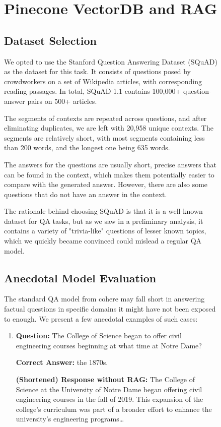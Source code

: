\documentclass[12pt]{article}
\begin{document}
\begin{figure}[H]
\newpage

\section{Pinecone VectorDB and RAG}

\subsection{Dataset Selection}

We opted to use the Stanford Question Answering Dataset (SQuAD) as the dataset for this task. 
It consists of questions posed by crowdworkers on a set of Wikipedia articles, with corresponding reading passages.
In total, SQuAD 1.1 contains 100,000+ question-answer pairs on 500+ articles.

The segments of contexts are repeated across questions, and after eliminating duplicates, we are left with 20,958 unique contexts.
The segments are relatively short, with most segments containing less than 200 words, and the longest one being 635 words.

The answers for the questions are usually short, precise answers that can be found in the context, which makes them potentially easier to compare with the generated answer. However, there are also some questions that do not have an answer in the context.

The rationale behind choosing SQuAD is that it is a well-known dataset for QA tasks, but as we saw in a preliminary analysis, it contains a variety of "trivia-like" questions of lesser known topics, which we quickly became convinced could mislead a regular QA model.

\subsection{Anecdotal Model Evaluation}

The standard QA model from cohere may fall short in answering factual questions in specific domains it might have not been exposed to enough. We present a few anecdotal examples of such cases:

\begin{enumerate}
    \item \textbf{Question:} The College of Science began to offer civil engineering courses beginning at what time at Notre Dame?
    
    \textbf{Correct Answer:} the 1870s.
    
    \textbf{(Shortened) Response without RAG:} The College of Science at the University of Notre Dame began offering civil engineering courses in the fall of 2019. This expansion of the college's curriculum was part of a broader effort to enhance the university's engineering programs\dots


\end{enumerate}
\end{figure}
\end{document}
